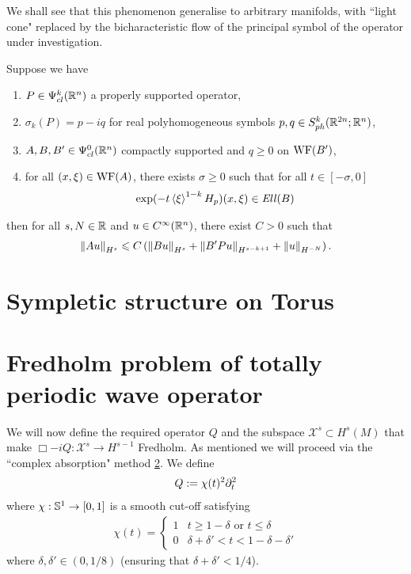 \documentclass[12pt]{article}
\begin{document}
 We shall see that this phenomenon generalise to arbitrary manifolds, with ``light cone" replaced by the bicharacteristic flow of the principal symbol of the operator under investigation. 


\begin{ftheorem} 
    Suppose we have 
    \begin{enumerate}
        \item $P \in \Psi^k_{cl}(\R^n)$ a properly supported operator,
        \item $\sigma_{k}(P) = p - iq$ for real polyhomogeneous symbols $p, q \in S^{k}_{ph}(\R^{2n}; \R^{n})$, 
        \item $A, B, B' \in \Psi^{0}_{cl}(\R^n)$ compactly supported and $q \geq 0 $ on $\WF(B')$, 
        \item for all $(x, \xi) \in \WF(A)$, there exists $\sigma \geq 0$ such that for all $t \in [-\sigma, 0]$
        \begin{align*}
            \exp(-t\sym[\xi]^{1-k}H_p)(x, \xi) \in \Ell(B)
        \end{align*}
    \end{enumerate}
    then for all $s, N \in \R$ and $u \in C^\infty(\R^n)$, there exist $C > 0$ such that 
    \begin{align*}
        \norm[Au]_{H^s} \leq C\brac{\norm[Bu]_{H^s} + \norm[B'Pu]_{H^{s - k + 1}} + \norm[u]_{H^{-N}}}. 
    \end{align*}
\end{ftheorem}


\section{Sympletic structure on Torus} 


\section{Fredholm problem of totally periodic wave operator} 
We will now define the required operator $Q$ and the subspace $\mathcal{X}^s \subset H^{s}(M)$ that make $\Box - iQ: \mathcal{X}^s \to H^{s -1}$ Fredholm.  As mentioned we will proceed via the ``complex absorption" method \ref{}. We define
\begin{align*}
Q := \chi(t)^2 \p_t^2
\end{align*}
where $\chi : \S^1 \to [0, 1]$ is a smooth cut-off satisfying
\begin{align*}
\chi(t) = 
\begin{cases}
1 & t \geq  1 - \delta \text{ or } t \leq \delta \\
0 &  \delta + \delta' < t < 1 - \delta - \delta'
\end{cases}
\end{align*}
where $\delta, \delta' \in (0, 1/8)$ (ensuring that $\delta+ \delta' < 1/4$). 
\end{document}
